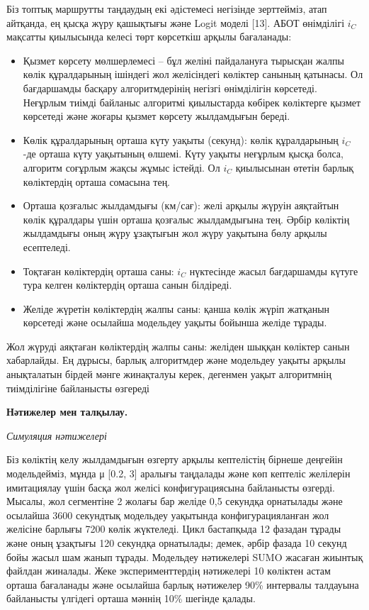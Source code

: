 \begin{multicols}{2}

Біз топтық маршрутты таңдаудың екі әдістемесі негізінде зерттейміз, атап
айтқанда, ең қысқа жүру қашықтығы және Logit моделі {[}13{]}. АБОТ
өнімділігі \(i_{C}\) мақсатты қиылысында келесі төрт көрсеткіш арқылы
бағаланады:

\begin{itemize}
\item
  Қызмет көрсету мөлшерлемесі -- бұл желіні пайдалануға тырысқан жалпы
  көлік құралдарының ішіндегі жол желісіндегі көліктер санының қатынасы.
  Ол бағдаршамды басқару алгоритмдерінің негізгі өнімділігін көрсетеді.
  Неғұрлым тиімді байланыс алгоритмі қиылыстарда көбірек көліктерге
  қызмет көрсетеді және жоғары қызмет көрсету жылдамдығын береді.
\item
  Көлік құралдарының орташа күту уақыты (секунд): көлік құралдарының
  \(i_{C}\) -де орташа күту уақытының өлшемі. Күту уақыты неғұрлым қысқа
  болса, алгоритм соғұрлым жақсы жұмыс істейді. Ол \(i_{C}\) қиылысынан
  өтетін барлық көліктердің орташа сомасына тең.
\item
  Орташа қозғалыс жылдамдығы (км/сағ): желі арқылы жүруін аяқтайтын
  көлік құралдары үшін орташа қозғалыс жылдамдығына тең. Әрбір көліктің
  жылдамдығы оның жүру ұзақтығын жол жүру уақытына бөлу арқылы
  есептеледі.
\item
  Тоқтаған көліктердің орташа саны: \(i_{C}\) нүктесінде жасыл
  бағдаршамды күтуге тура келген көліктердің орташа санын білдіреді.
\item
  Желіде жүретін көліктердің жалпы саны: қанша көлік жүріп жатқанын
  көрсетеді және осылайша модельдеу уақыты бойынша желіде тұрады.
\end{itemize}

Жол жүруді аяқтаған көліктердің жалпы саны: желіден шыққан көліктер
санын хабарлайды. Ең дұрысы, барлық алгоритмдер және модельдеу уақыты
арқылы анықталатын бірдей мәнге жинақталуы керек, дегенмен уақыт
алгоритмнің тиімділігіне байланысты өзгереді

{\bfseries Нәтижелер мен талқылау.}

\emph{Симуляция нәтижелері}

Біз көліктің келу жылдамдығын өзгерту арқылы кептелістің бірнеше
деңгейін модельдейміз, мұнда μ {[}0.2, 3{]} аралығы таңдалады және көп
кептеліс желілерін имитациялау үшін басқа жол желісі конфигурациясына
байланысты өзгерді. Мысалы, жол сегментіне 2 жолағы бар желіде 0,5
секундқа орнатылады және осылайша 3600 секундтық модельдеу уақытында
конфигурацияланған жол желісіне барлығы 7200 көлік жүктеледі. Цикл
бастапқыда 12 фазадан тұрады және оның ұзақтығы 120 секундқа орнатылады;
демек, әрбір фазада 10 секунд бойы жасыл шам жанып тұрады. Модельдеу
нәтижелері SUMO жасаған жиынтық файлдан жиналады. Жеке эксперименттердің
нәтижелері 10 көліктен астам орташа бағаланады және осылайша барлық
нәтижелер 90\% интервалы талдауына байланысты үлгідегі орташа мәннің
10\% шегінде қалады.


\end{multicols}
